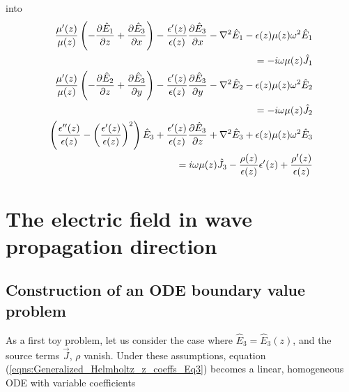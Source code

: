 \documentclass[12pt,twoside]{report}
\begin{document}
into
\begin{subequations}
\begin{align}
\label{eqns:Generalized_Helmholtz_z_coeffs_Eq1}
\dfrac{\mu'(z)}{\mu(z)}\left( -\dfrac{\partial \hat{E}_1}{\partial z} + \dfrac{\partial \hat{E}_3}{\partial x}\right)-\dfrac{\epsilon'(z)}{\epsilon(z)}\dfrac{\partial \hat{E}_3}{\partial x}-\nabla^2 \hat{E}_1 - \epsilon(z) \mu(z) \omega^2 \hat{E}_1 &\\
= -i\omega \mu(z)\hat{J}_1 \notag\\
\label{eqns:Generalized_Helmholtz_z_coeffs_Eq2}
\dfrac{\mu'(z)}{\mu(z)}\left( -\dfrac{\partial \hat{E}_2}{\partial z} + \dfrac{\partial \hat{E}_3}{\partial y}\right)-\dfrac{\epsilon'(z)}{\epsilon(z)}\dfrac{\partial \hat{E}_3}{\partial y}-\nabla^2 \hat{E}_2 - \epsilon(z) \mu(z) \omega^2 \hat{E}_2 &\\= -i \omega \mu(z)\hat{J}_2	\notag\\
\label{eqns:Generalized_Helmholtz_z_coeffs_Eq3}
\left( \dfrac{\epsilon''(z)}{\epsilon(z)}-\left( \dfrac{\epsilon'(z)}{\epsilon(z)}\right)^2 \right)\hat{E}_3 +\dfrac{\epsilon'(z)}{\epsilon(z)}\dfrac{\partial \hat{E}_3}{\partial z} + \nabla^2 \hat{E}_3 +\epsilon(z) \mu(z) \omega^2 \hat{E}_3 &\\
= i \omega \mu(z)\hat{J}_3 - \dfrac{\rho(z)}{\epsilon(z)}\epsilon'(z) + \dfrac{\rho'(z)}{\epsilon(z)} \notag 
\end{align}
\end{subequations}


\chapter{The electric field in wave propagation direction}

\section{Construction of an ODE boundary value problem}
As a first toy problem, let us consider the case where $\hat{E}_3 = \hat{E}_3(z)$, and the source terms $\overrightarrow{J}$, $\rho$ vanish. Under these assumptions, equation (\ref{eqns:Generalized_Helmholtz_z_coeffs_Eq3}) becomes a linear, homogeneous ODE with variable coefficients
\end{document}
